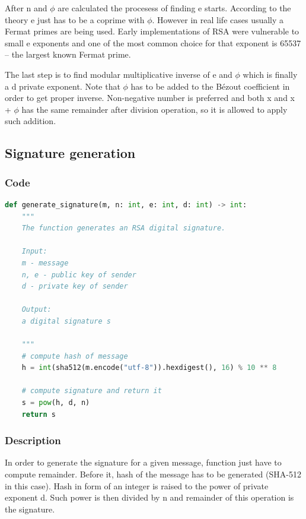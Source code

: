 \documentclass{article}
\begin{document}
After n and $\phi$ are calculated the procesess of finding e starts. According to the theory
e just has to be a coprime with $\phi$. However in real life cases usually a Fermat primes
are being used. Early implementations of RSA were vulnerable to small e exponents and one of the
most common choice for that exponent is 65537 -- the largest known Fermat prime.

The last step is to find modular multiplicative inverse of e and $\phi$ which is finally
a d private exponent. Note that $\phi$ has to be added to the Bézout coefficient in order to get
proper inverse. Non-negative number is preferred and both x and x + $\phi$ has the same remainder
after division operation, so it is allowed to apply such addition.

\subsection{Signature generation}
\subsubsection{Code}

\small

\begin{lstlisting}[language=Python]
    def generate_signature(m, n: int, e: int, d: int) -> int:
    """
    The function generates an RSA digital signature.

    Input:
    m - message
    n, e - public key of sender
    d - private key of sender

    Output:
    a digital signature s

    """
    # compute hash of message
    h = int(sha512(m.encode("utf-8")).hexdigest(), 16) % 10 ** 8

    # compute signature and return it
    s = pow(h, d, n)
    return s
\end{lstlisting}

\normalsize

\subsubsection{Description}
In order to generate the signature for a given message, function just have to compute
remainder. Before it, hash of the message has to be generated (SHA-512 in this case).
Hash in form of an integer is raised to the power of private exponent d. Such power is then
divided by n and remainder of this operation is the signature.
\end{document}
